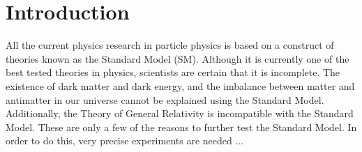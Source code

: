 \chapter{Introduction}

All the current physics research in particle physics is based on a construct of theories known as the Standard Model (SM). 
Although it is currently one of the best tested theories in physics, scientists are certain that it is incomplete.
The existence of dark matter and dark energy, and the imbalance between matter and antimatter in our universe cannot be explained using the Standard Model.
Additionally, the Theory of General Relativity is incompatible with the Standard Model.
These are only a few of the reasons to further test the Standard Model. 
In order to do this, very precise experiments are needed ... 
